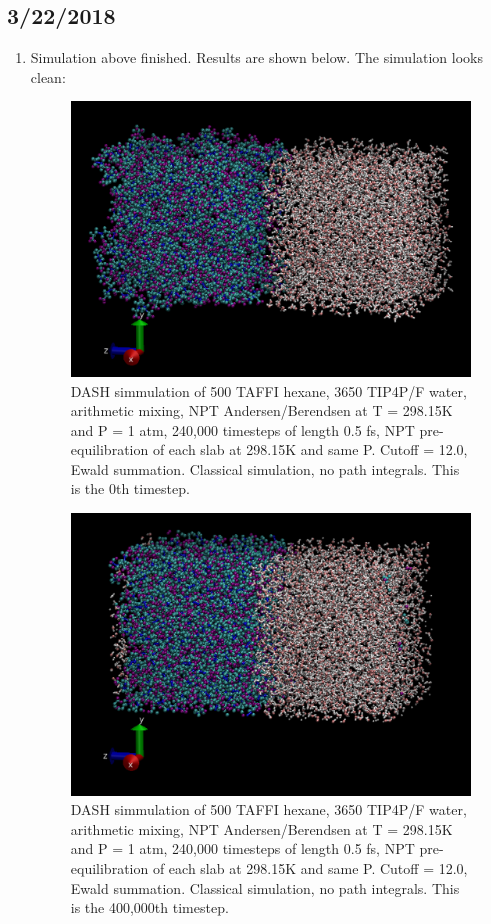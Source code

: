 \documentclass[12pt,reqno]{amsart}
\numberwithin{equation}{section}
\begin{document}
\subsection{3/22/2018}
\begin{enumerate}
\item Simulation above finished.  Results are shown below.  The simulation looks clean: 

\begin{figure}[H]
\centering
\includegraphics[scale=0.4]{dash_taffi-tip4pF_classical_arithmetic_NPT_0}
\caption{DASH simmulation of 500 TAFFI hexane, 3650 TIP4P/F water, arithmetic mixing, NPT Andersen/Berendsen at T = 298.15K and P = 1 atm, 240,000 timesteps of length 0.5 fs, NPT pre-equilibration of each slab at 298.15K and same P.  Cutoff = 12.0, Ewald summation.  Classical simulation, no path integrals.  This is the 0th timestep.}
\end{figure}

\begin{figure}[H]
\centering
\includegraphics[scale=0.4]{dash_taffi-tip4pF_classical_arithmetic_NPT_400000}
\caption{DASH simmulation of 500 TAFFI hexane, 3650 TIP4P/F water, arithmetic mixing, NPT Andersen/Berendsen at T = 298.15K and P = 1 atm, 240,000 timesteps of length 0.5 fs, NPT pre-equilibration of each slab at 298.15K and same P.  Cutoff = 12.0, Ewald summation.  Classical simulation, no path integrals.  This is the 400,000th timestep.}
\end{figure}


\end{enumerate}
\end{document}
